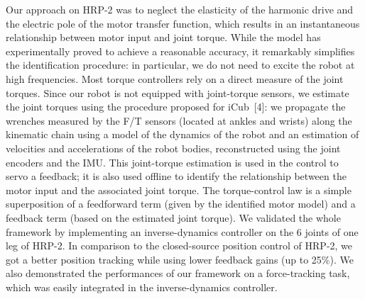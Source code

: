 Our approach on HRP-2 was to neglect the elasticity of the harmonic drive and the electric pole of the motor transfer function, which results in an instantaneous relationship between motor input and joint torque. 
While the model has experimentally proved to achieve a reasonable accuracy, it remarkably simplifies the identification procedure: in particular, we do not need to excite the robot at high frequencies. 
Most torque controllers rely on a direct measure of the joint torques. 
Since our robot is not equipped with joint-torque sensors, we estimate the joint torques using the procedure proposed for iCub~[4]: we propagate the wrenches measured by the F/T sensors (located at ankles and wrists) along the kinematic chain using a model of the dynamics of the robot and an estimation of velocities and accelerations of the robot bodies, reconstructed using the joint encoders and the IMU. 
This joint-torque estimation is used in the control to servo a feedback; it is also used offline to identify the relationship between the motor input and the associated joint torque. 
The torque-control law is a simple superposition of a feedforward term (given by the identified motor model) and a feedback term (based on the estimated joint torque). 
We validated the whole framework by implementing an inverse-dynamics controller on the 6 joints of one leg of HRP-2. 
In comparison to the closed-source position control of HRP-2, we got a better position tracking while using lower feedback gains (up to 25\%). 
We also demonstrated the performances of our framework on a force-tracking task, which was easily integrated in the inverse-dynamics controller.
